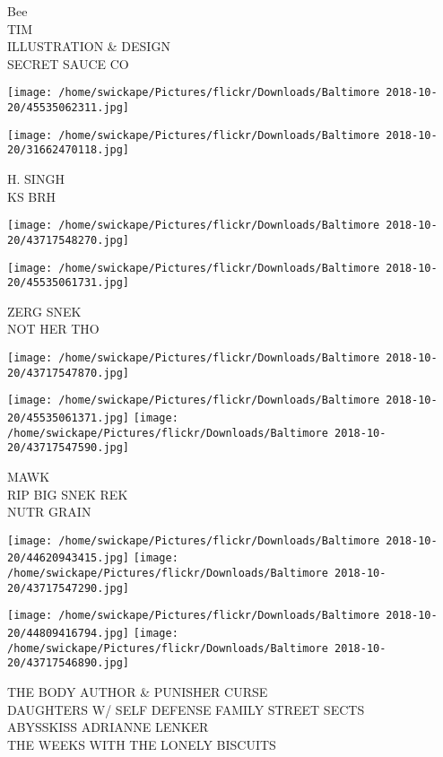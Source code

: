 \documentclass[10pt,letterpaper]{article}
\begin{document}
Bee\\
TIM\\
ILLUSTRATION \& DESIGN\\
SECRET SAUCE CO
\pagebreak

\texttt{[image: /home/swickape/Pictures/flickr/Downloads/Baltimore 2018-10-20/45535062311.jpg]}

\vspace{0.25in}
\texttt{[image: /home/swickape/Pictures/flickr/Downloads/Baltimore 2018-10-20/31662470118.jpg]}

H. SINGH\\
KS BRH
\pagebreak

\texttt{[image: /home/swickape/Pictures/flickr/Downloads/Baltimore 2018-10-20/43717548270.jpg]}

\vspace{0.25in}
\texttt{[image: /home/swickape/Pictures/flickr/Downloads/Baltimore 2018-10-20/45535061731.jpg]}

ZERG SNEK\\
NOT HER THO
\pagebreak

\texttt{[image: /home/swickape/Pictures/flickr/Downloads/Baltimore 2018-10-20/43717547870.jpg]}

\vspace{0.25in}
\texttt{[image: /home/swickape/Pictures/flickr/Downloads/Baltimore 2018-10-20/45535061371.jpg]}
\texttt{[image: /home/swickape/Pictures/flickr/Downloads/Baltimore 2018-10-20/43717547590.jpg]}

MAWK\\
RIP BIG SNEK REK\\
NUTR GRAIN
\pagebreak

\texttt{[image: /home/swickape/Pictures/flickr/Downloads/Baltimore 2018-10-20/44620943415.jpg]}
\texttt{[image: /home/swickape/Pictures/flickr/Downloads/Baltimore 2018-10-20/43717547290.jpg]}

\texttt{[image: /home/swickape/Pictures/flickr/Downloads/Baltimore 2018-10-20/44809416794.jpg]}
\texttt{[image: /home/swickape/Pictures/flickr/Downloads/Baltimore 2018-10-20/43717546890.jpg]}

THE BODY AUTHOR \& PUNISHER CURSE\\
DAUGHTERS W/ SELF DEFENSE FAMILY STREET SECTS\\
ABYSSKISS ADRIANNE LENKER\\
THE WEEKS WITH THE LONELY BISCUITS
\pagebreak
\end{document}
